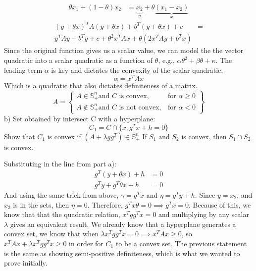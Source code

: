 \documentclass{article}
\begin{document}
\begin{align*}
	\theta x_1 + (1-\theta) x_2 &= \underbrace{x_2}_y + \theta\underbrace{(x_1 - x_2)}_x
\end{align*}
\begin{align*}
	(y + \theta x)^TA(y + \theta x) + b^T(y+ \theta x) + c &= \\ y^TAy + b^Ty + c + \theta^2x^TAx + \theta(2x^TAy + b^Tx)
\end{align*}
Since the original function gives us a scalar value, we can model the the vector quadratic into a scalar quadratic as a function of $\theta$, e.g., $\alpha\theta^2 + \beta\theta + \kappa$. The leading term $\alpha$ is key and dictates the convexity of the scalar quadratic. 
\begin{equation*}
	\alpha = x^TAx
\end{equation*}
Which is a quadratic that also dictates definiteness of a matrix.
\begin{equation*}
	A = \left.
	\begin{cases}
		A \in \mathbb{S}^n_+ \text{and } C \text{ is convex} , & \text{for } \alpha \geq 0 \\
		A \not\in \mathbb{S}^n_+ \text{and } C \text{ is not convex}, & \text{for } \alpha < 0
	\end{cases}
	\right\}
\end{equation*}
b) Set obtained by intersect C with a hyperplane:
\begin{equation*}
	C_1 = C \cap \{ x: g^Tx + h = 0 \}
\end{equation*}
Show that $C_1$ is convex if $(A + \lambda gg^T) \in \mathbb{S}^n_+$
If $S_1 \text{ and } S_2$ is convex, then $S_1 \cap S_2$ is convex. \par
\noindent
Substituting in the line from part a):
\begin{align*}
	g^T(y + \theta x)  + h &= 0 \\
	g^Ty + g^T\theta x + h &= 0
\end{align*}
And using the same trick from above, $\gamma = g^Tx$ and $\eta = g^Ty + h$. Since $y = x_2$, and $x_2$ is in the sets, then $\eta = 0$. Therefore, $g^Tx\theta = 0 \implies g^Tx = 0$. Because of this, we know that that the quadratic relation, $x^Tgg^Tx = 0$ and multiplying by any scalar $\lambda$ gives an equivalent result. We already know that a hyperplane generates a convex set, we know that when $\lambda x^Tgg^Tx = 0 \implies x^TAx \geq 0$, so $ x^TAx + \lambda x^Tgg^Tx \geq 0$ in order for $C_1$ to be a convex set. The previous statement is the same as showing semi-positive definiteness, which is what we wanted to prove initially. 
\end{document}
